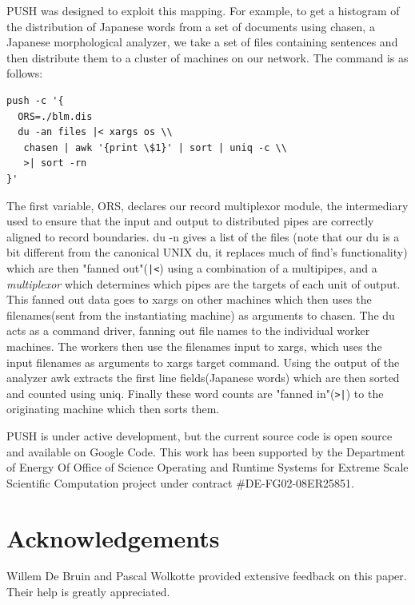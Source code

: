 \documentclass{sig-alt-release2}
\begin{document}
PUSH was designed to exploit this mapping. For example, to get a histogram of 
the distribution of Japanese words from a set of documents using chasen, 
a Japanese morphological analyzer, we take a set of files containing sentences 
and then distribute them to a cluster of machines on our network. The command 
is as follows:

\begin{verbatim}
push -c '{
  ORS=./blm.dis
  du -an files |< xargs os \\
   chasen | awk '{print \$1}' | sort | uniq -c \\
   >| sort -rn
}'
\end{verbatim}

The first variable, ORS, declares our record multiplexor module, the intermediary 
used to ensure that the input and output to distributed pipes are correctly 
aligned to record boundaries. du -n gives a list of the files (note that our 
du is a bit different from the canonical UNIX du, it replaces much of find's 
functionality) which are then "fanned out"(\verb!|<!) using a combination 
of a multipipes, and a \emph{multiplexor} 
which determines which pipes are the targets of each unit of output.  
This fanned out data goes to xargs on other machines which 
then uses the filenames(sent from the instantiating machine) as arguments to 
chasen. The du acts as a command driver, fanning out file names to the 
individual worker machines. The workers then use the filenames input to 
xargs, which uses the input filenames as arguments to xargs target command. 
Using the output of the analyzer awk extracts the first line fields(Japanese 
words) which are then sorted and counted using uniq.  Finally these word 
counts are "fanned in"(\verb!>|!) to the originating machine which then 
sorts them. 

PUSH is under active development, but the current source code is open source 
and available on Google Code.
This work has been supported by the Department of Energy Of Office of Science Operating and Runtime Systems for Extreme Scale Scientific Computation project under contract \#DE-FG02-08ER25851. 

\section{Acknowledgements}

Willem De Bruin and Pascal Wolkotte provided extensive feedback on this paper. Their help is greatly appreciated.





\end{document}
